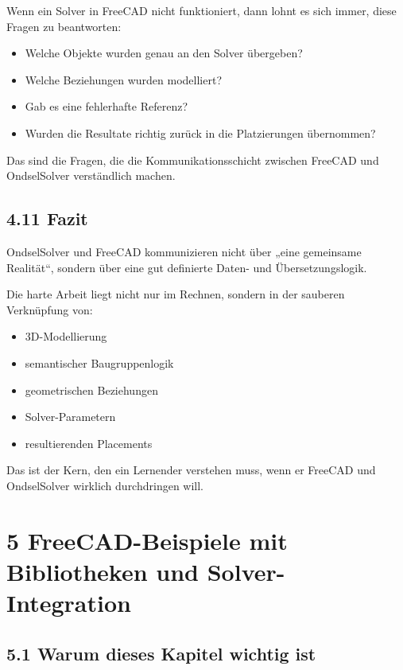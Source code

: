 \documentclass[
  12pt
]{book}
\providecommand{\tightlist}{%
  \setlength{\itemsep}{0pt}\setlength{\parskip}{0pt}}
\begin{document}
Wenn ein Solver in FreeCAD nicht funktioniert, dann lohnt es sich immer,
diese Fragen zu beantworten:

\begin{itemize}
\tightlist
\item
  Welche Objekte wurden genau an den Solver übergeben?
\item
  Welche Beziehungen wurden modelliert?
\item
  Gab es eine fehlerhafte Referenz?
\item
  Wurden die Resultate richtig zurück in die Platzierungen übernommen?
\end{itemize}

Das sind die Fragen, die die Kommunikationsschicht zwischen FreeCAD und
OndselSolver verständlich machen.

\hypertarget{fazit-2}{%
\section{\texorpdfstring{{4.11} Fazit}{4.11 Fazit}}\label{fazit-2}}

OndselSolver und FreeCAD kommunizieren nicht über „eine gemeinsame
Realität``, sondern über eine gut definierte Daten- und
Übersetzungslogik.

Die harte Arbeit liegt nicht nur im Rechnen, sondern in der sauberen
Verknüpfung von:

\begin{itemize}
\tightlist
\item
  3D-Modellierung
\item
  semantischer Baugruppenlogik
\item
  geometrischen Beziehungen
\item
  Solver-Parametern
\item
  resultierenden Placements
\end{itemize}

Das ist der Kern, den ein Lernender verstehen muss, wenn er FreeCAD und
OndselSolver wirklich durchdringen will.

\hypertarget{kap-freecad-beispiele}{%
\chapter{\texorpdfstring{{5} FreeCAD-Beispiele mit Bibliotheken und
Solver-Integration}{5 FreeCAD-Beispiele mit Bibliotheken und Solver-Integration}}\label{kap-freecad-beispiele}}

\hypertarget{warum-dieses-kapitel-wichtig-ist}{%
\section{\texorpdfstring{{5.1} Warum dieses Kapitel wichtig
ist}{5.1 Warum dieses Kapitel wichtig ist}}\label{warum-dieses-kapitel-wichtig-ist}}
\end{document}
